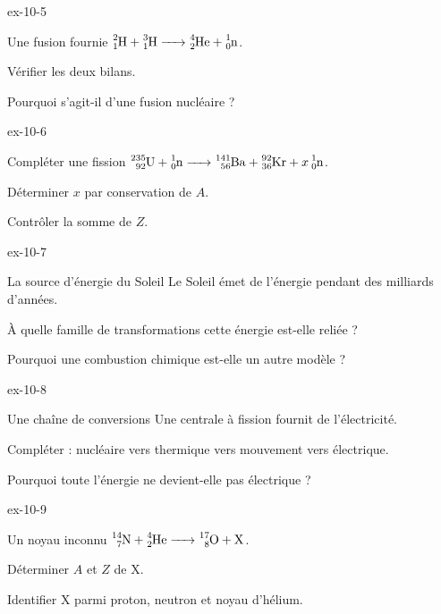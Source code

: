 \begin{blocLivre}{ex-10-5}\begin{exercice}[2]{Une fusion fournie}
$\ce{^{2}_{1}H + ^{3}_{1}H -> ^{4}_{2}He + ^{1}_{0}n}$.
\begin{questions}
\item Vérifier les deux bilans.
\item Pourquoi s’agit-il d’une fusion nucléaire ?
\end{questions}
\end{exercice}\end{blocLivre}
\begin{blocLivre}{ex-10-6}\begin{exercice}[2]{Compléter une fission}
$\ce{^{235}_{92}U + ^{1}_{0}n -> ^{141}_{56}Ba + ^{92}_{36}Kr + x ^{1}_{0}n}$.
\begin{questions}
\item Déterminer $x$ par conservation de $A$.
\item Contrôler la somme de $Z$.
\end{questions}
\end{exercice}\end{blocLivre}
\begin{blocLivre}{ex-10-7}\begin{exercice}[2]{La source d’énergie du Soleil}
Le Soleil émet de l’énergie pendant des milliards d’années.
\begin{questions}
\item À quelle famille de transformations cette énergie est-elle reliée ?
\item Pourquoi une combustion chimique est-elle un autre modèle ?
\end{questions}
\end{exercice}\end{blocLivre}
\begin{blocLivre}{ex-10-8}\begin{exercice}[2]{Une chaîne de conversions}
Une centrale à fission fournit de l’électricité.
\begin{questions}
\item Compléter : nucléaire vers thermique vers mouvement vers électrique.
\item Pourquoi toute l’énergie ne devient-elle pas électrique ?
\end{questions}
\end{exercice}\end{blocLivre}
\begin{blocLivre}{ex-10-9}\begin{exercice}[3]{Un noyau inconnu}
$\ce{^{14}_{7}N + ^{4}_{2}He -> ^{17}_{8}O + X}$.
\begin{questions}
\item Déterminer $A$ et $Z$ de X.
\item Identifier X parmi proton, neutron et noyau d’hélium.
\end{questions}
\end{exercice}\end{blocLivre}
